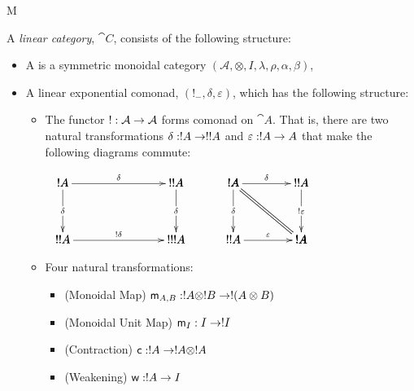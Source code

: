 M\begin{definition}
  \label{def:exp-action}
  A \emph{linear category}, $\cat{C}$, consists of the following structure:
  \begin{itemize}
  \item A is a symmetric monoidal category $(\mathcal{A},\otimes,I,\lambda,\rho,\alpha,\beta)$,
  \item A linear exponential comonad, $(!_{-},\delta,\varepsilon)$,
    which has the following structure:
    
    \begin{itemize}    
    \item The functor $! : \mathcal{A} \rightarrow \mathcal{A}$ forms comonad
      on $\cat{A}$.  That is, there are two natural transformations
      $\delta : ! A \rightarrow !! A$ and $\varepsilon : !A \rightarrow A$ that make
      the following diagrams commute:
      \begin{center}
        \begin{math}
          \begin{array}{cccc}
            \bfig
            \square|amma|/->`->`->`->/<1000,500>[
              !A`
              !!A`
              !!A`
              !!!A;
              \delta`
              \delta`
              \delta`
              !\delta]
            \efig
            & \quad &
            \bfig
            \btriangle|mma|/->`=`->/<600,500>[
              !A`
              !!A`
              !A;
              \delta``
              \varepsilon]

            \qtriangle|amm|/->`=`->/<600,500>[
              !A`
              !!A`
              !A;
              \delta``
              !\varepsilon]
            \efig
          \end{array}
        \end{math}
      \end{center}    

    \item Four natural transformations:
      \begin{itemize}
      \item (Monoidal Map) $\mathsf{m}_{A,B} : ! A \otimes ! B \rightarrow ! (A \otimes B)$
      \item (Monoidal Unit Map) $\mathsf{m}_I : I \rightarrow ! I$
      \item (Contraction) $\mathsf{c} : !A \rightarrow !A \otimes !A$
      \item (Weakening) $\mathsf{w} : ! A \rightarrow I$
      \end{itemize}


\end{itemize}
\end{itemize}
\end{definition}
